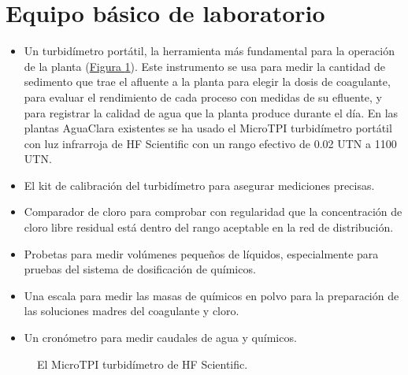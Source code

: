 \documentclass[letterpaper,10pt,spanish]{sphinxmanual}
\let\sphinxpxdimen\pdfpxdimen\else\newdimen\sphinxpxdimen
\begin{document}
\section{Equipo básico de laboratorio}
\label{\detokenize{Introduction/Requirements:equipo-basico-de-laboratorio}}\label{\detokenize{Introduction/Requirements:heading-equipo-basico-de-laboratorio}}\begin{itemize}
\item {} 
Un turbidímetro portátil, la herramienta más fundamental para la operación de la planta (\hyperref[\detokenize{Introduction/Requirements:figure-microtpi}]{Figura \ref{\detokenize{Introduction/Requirements:figure-microtpi}}}). Este instrumento se usa para medir la cantidad de sedimento que trae el afluente a la planta para elegir la dosis de coagulante, para evaluar el rendimiento de cada proceso con medidas de su efluente, y para registrar la calidad de agua que la planta produce durante el día. En las plantas AguaClara existentes se ha usado el MicroTPI turbidímetro portátil con luz infrarroja de HF Scientific con un rango efectivo de 0.02 UTN a 1100 UTN.

\item {} 
El kit de calibración del turbidímetro para asegurar mediciones precisas.

\item {} 
Comparador de cloro para comprobar con regularidad que la concentración de cloro libre residual está dentro del rango aceptable en la red de distribución.

\item {} 
Probetas para medir volúmenes pequeños de líquidos, especialmente para pruebas del sistema de dosificación de químicos.

\item {} 
Una escala para medir las masas de químicos en polvo para la preparación de las soluciones madres del coagulante y cloro.

\item {} 
Un cronómetro para medir caudales de agua y químicos.

\end{itemize}

\begin{figure}[htbp]
\centering
\capstart

\noindent\sphinxincludegraphics[width=200\sphinxpxdimen]{{microtpi}.png}
\caption{El MicroTPI turbidímetro de HF Scientific.}\label{\detokenize{Introduction/Requirements:id1}}\label{\detokenize{Introduction/Requirements:figure-microtpi}}\end{figure}
\end{document}

